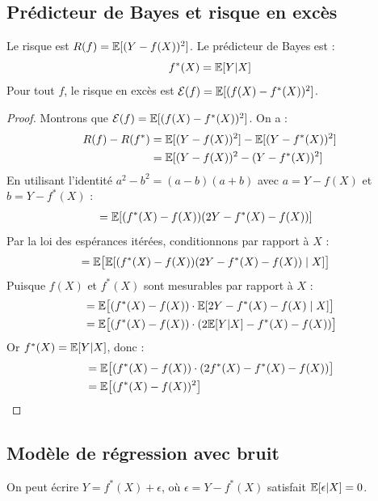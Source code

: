 \subsection{Prédicteur de Bayes et risque en excès}

\begin{proposition}
Le risque est $R(f)=\mathbb{E}[(Y-f(X))^{2}]$. Le prédicteur de Bayes est :
\begin{equation}
f^{*}(X)=\mathbb{E}[Y|X]
\end{equation}
Pour tout $f$, le risque en excès est $\mathcal{E}(f) = \mathbb{E}[(f(X)-f^{*}(X))^{2}]$.
\end{proposition}

\begin{proof}
Montrons que $\mathcal{E}(f) = \mathbb{E}[(f(X)-f^{*}(X))^{2}]$. On a :
\begin{align*}
R(f) - R(f^*) &= \mathbb{E}[(Y-f(X))^2] - \mathbb{E}[(Y-f^*(X))^2] \\
&= \mathbb{E}[(Y-f(X))^2 - (Y-f^*(X))^2]
\end{align*}
En utilisant l'identité $a^2 - b^2 = (a-b)(a+b)$ avec $a = Y - f(X)$ et $b = Y - f^*(X)$ :
\begin{align*}
&= \mathbb{E}[(f^*(X) - f(X))(2Y - f^*(X) - f(X))]
\end{align*}
Par la loi des espérances itérées, conditionnons par rapport à $X$ :
\begin{align*}
&= \mathbb{E}\big[\mathbb{E}[(f^*(X) - f(X))(2Y - f^*(X) - f(X)) \mid X]\big]
\end{align*}
Puisque $f(X)$ et $f^*(X)$ sont mesurables par rapport à $X$ :
\begin{align*}
&= \mathbb{E}\big[(f^*(X) - f(X)) \cdot \mathbb{E}[2Y - f^*(X) - f(X) \mid X]\big] \\
&= \mathbb{E}\big[(f^*(X) - f(X)) \cdot (2\mathbb{E}[Y|X] - f^*(X) - f(X))\big]
\end{align*}
Or $f^*(X) = \mathbb{E}[Y|X]$, donc :
\begin{align*}
&= \mathbb{E}\big[(f^*(X) - f(X)) \cdot (2f^*(X) - f^*(X) - f(X))\big] \\
&= \mathbb{E}\big[(f^*(X) - f(X))^2\big]
\end{align*}
\end{proof}

\subsection{Modèle de régression avec bruit}

\begin{proposition}
On peut écrire $Y = f^{*}(X) + \epsilon$, où $\epsilon = Y - f^*(X)$ satisfait $\mathbb{E}[\epsilon|X]=0$.
\end{proposition}

